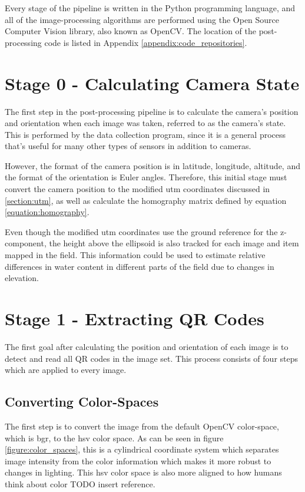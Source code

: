 Every stage of the pipeline is written in the Python programming language, and all of the image-processing algorithms are performed using the Open Source Computer Vision library, also known as OpenCV.  The location of the post-processing code is listed in Appendix \ref{appendix:code_repositories}.

\section{Stage 0 - Calculating Camera State}
\label{processing-stage0}

The first step in the post-processing pipeline is to calculate the camera's position and orientation when each image was taken, referred to as the camera's state.  This is performed by the data collection program, since it is a general process that's useful for many other types of sensors in addition to cameras.  

However, the format of the camera position is in latitude, longitude, altitude, and the format of the orientation is Euler angles.  Therefore, this initial stage must convert the camera position to the modified \ac{utm} coordinates discussed in \ref{section:utm}, as well as calculate the homography matrix defined by equation \ref{equation:homography}.  

Even though the modified \ac{utm} coordinates use the ground reference for the z-component, the height above the ellipsoid is also tracked for each image and item mapped in the field.  This information could be used to estimate relative differences in water content in different parts of the field due to changes in elevation. 

\section{Stage 1 - Extracting QR Codes}
\label{processing-stage1}

The first goal after calculating the position and orientation of each image is to detect and read all QR codes in the image set.  This process consists of four steps which are applied to every image.

\subsection{Converting Color-Spaces}

The first step is to convert the image from the default OpenCV color-space, which is \ac{bgr}, to the \ac{hsv} color space.  As can be seen in figure \ref{figure:color_spaces}, this is a cylindrical coordinate system which separates image intensity from the color information which makes it more robust to changes in lighting. This \ac{hsv} color space is also more aligned to how humans think about color TODO insert reference.


